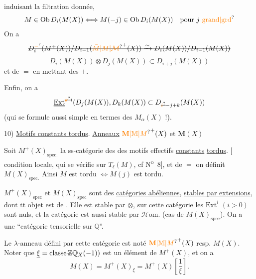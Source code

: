 induisant la filtration donnée, 
\[
M\in\mathrm{Ob}\,D_i(M(X))\Longleftrightarrow M(-j)\in\mathrm{Ob}\,D_i(M(X))\quad\text{pour $j$ \unsure{grand|grd}}
\]
On a
\[
\deleted{D_i^{\unsure{-}}(M^+(X))/D_{i-1}(\unsure{\bar M|M|\mathcal M}^+(X))\xrightarrow{\sim}D_i(M(X))/D_{i-1}(M(X))}
\]
\[
D_i(M(X))\otimes D_j(M(X))\subset D_{i+j}(M(X))
\]
et de $=$ en mettant des $+$. 

Enfin, on a
\[
\underline{\underline{\mathrm{Ext}}}^{\deleted{\unsure{k}}i}(D_j(M(X)),D_k(M(X))\subset D_{\deleted{\unsure{i}}-j+k}(M(X))
\]
(qui se formule aussi simple en termes des $M_{\alpha}(X)$ !).

10) \uline{Motifs constants tordus}. \uline{Anneaux} $\unsure{\mathbf M|\mathbb M|M}^+(X)$ et $\mathbf M(X)$

Soit $M^+(X)_{\mathrm{spec.}}$ la ss-catégorie des des motifs effectifs \uline{constants} \uline{tordus}.
[ condition locale, qui se vérifie sur $T_\ell(M)$, cf N\textsuperscript{o}~8], et de $=$ on définit $M(X)_{\mathrm{spec.}}$  Ainsi $M$ est tordu $\Longleftrightarrow M(j)$ est tordu.

$M^+(X)_{\mathrm{spec}}$ et $M(X)_{\mathrm{spec}}$ sont des \uline{catégories abéliennes}, \uline{stables par extensions}, \uline{dont tt objet est de}
. Elle est stable par $\otimes$, sur cette catégorie les $\mathrm{Ext}^i$ $(i>0)$ sont nuls, et la catégorie est aussi stable par $\mathscr{H}\mathrm{om}$. (cas de $M(X)_{\mathrm{spec}}$). On a une ``catégorie tensorielle  sur $\mathbb Q$''.

Le  $\lambda$-anneau défini par cette catégorie est noté $\unsure{\mathbf M|\mathbb M|M}^+(X)$ resp. $M(X)$. Noter que $\underline{\xi}=\mathrm{classe}\,\deleted{\mathbb Z}\mathbb Q_X(-1))$ est un élément de $M^+(X)$, et on a
\[
M(X)=M^+(X)_\xi=M^+(X)\left[\frac{1}{\xi}\right].
\]

